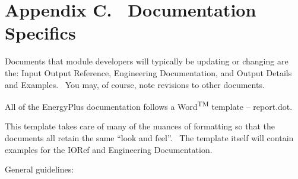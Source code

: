 \chapter{Appendix C.~ Documentation Specifics}\label{appendix-c.-documentation-specifics}

Documents that module developers will typically be updating or changing are the: Input Output Reference, Engineering Documentation, and Output Details and Examples.~ You may, of course, note revisions to other documents.

All of the EnergyPlus documentation follows a Word\textsuperscript{TM} template -- report.dot.

This template takes care of many of the nuances of formatting so that the documents all retain the same ``look and feel''.~ The template itself will contain examples for the IORef and Engineering Documentation.

General guidelines:

